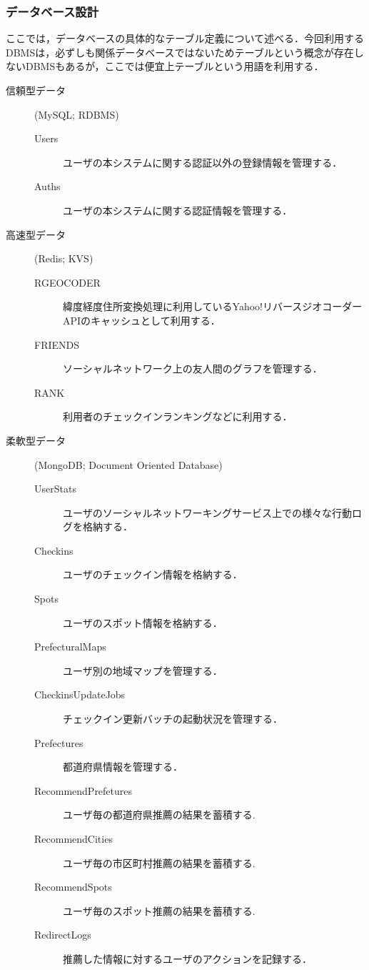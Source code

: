 \documentclass{jsarticle}
\begin{document}
\subsubsection{データベース設計}

ここでは，データベースの具体的なテーブル定義について述べる．今回利用するDBMSは，必ずしも関係データベースではないためテーブルという概念が存在しないDBMSもあるが，ここでは便宜上テーブルという用語を利用する．

\begin{description}
    \item[信頼型データ] (MySQL; RDBMS)
        \begin{description}
            \item[Users] ユーザの本システムに関する認証以外の登録情報を管理する．
            \item[Auths] ユーザの本システムに関する認証情報を管理する．
        \end{description}
    \item[高速型データ] (Redis; KVS)
        \begin{description}
            \item[RGEOCODER] 緯度経度住所変換処理に利用しているYahoo!リバースジオコーダーAPI\cite{yolp_rgc}のキャッシュとして利用する．
            \item[FRIENDS]  ソーシャルネットワーク上の友人間のグラフを管理する．
            \item[RANK]     利用者のチェックインランキングなどに利用する．
        \end{description}
    \item[柔軟型データ] (MongoDB; Document Oriented Database)
        \begin{description}
            \item[UserStats] ユーザのソーシャルネットワーキングサービス上での様々な行動ログを格納する．
            \item[Checkins] ユーザのチェックイン情報を格納する．
            \item[Spots] ユーザのスポット情報を格納する．
            \item[PrefecturalMaps] ユーザ別の地域マップを管理する．
            \item[CheckinsUpdateJobs] チェックイン更新バッチの起動状況を管理する．
            \item[Prefectures] 都道府県情報を管理する．
            \item[RecommendPrefetures] ユーザ毎の都道府県推薦の結果を蓄積する.
            \item[RecommendCities] ユーザ毎の市区町村推薦の結果を蓄積する.
            \item[RecommendSpots] ユーザ毎のスポット推薦の結果を蓄積する.
            \item[RedirectLogs] 推薦した情報に対するユーザのアクションを記録する．
        \end{description}
\end{description}
\end{document}
